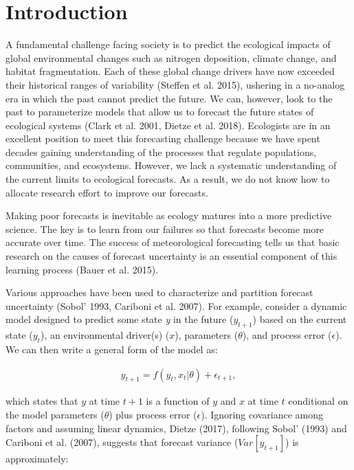\documentclass[12pt,]{article}
\begin{document}
\section{Introduction}\label{introduction}

A fundamental challenge facing society is to predict the ecological
impacts of global environmental changes such as nitrogen deposition,
climate change, and habitat fragmentation. Each of these global change
drivers have now exceeded their historical ranges of variability
(Steffen et al. 2015), ushering in a no-analog era in which the past
cannot predict the future. We can, however, look to the past to
parameterize models that allow us to forecast the future states of
ecological systems (Clark et al. 2001, Dietze et al. 2018). Ecologists
are in an excellent position to meet this forecasting challenge because
we have spent decades gaining understanding of the processes that
regulate populations, communities, and ecosystems. However, we lack a
systematic understanding of the current limits to ecological forecasts.
As a result, we do not know how to allocate research effort to improve
our forecasts.

Making poor forecasts is inevitable as ecology matures into a more
predictive science. The key is to learn from our failures so that
forecasts become more accurate over time. The success of meteorological
forecasting tells us that basic research on the causes of forecast
uncertainty is an essential component of this learning process (Bauer et
al. 2015).

Various approaches have been used to characterize and partition forecast
uncertainty (Sobol' 1993, Cariboni et al. 2007). For example, consider a
dynamic model designed to predict some state \emph{y} in the future
(\(y_{t+1}\)) based on the current state (\(y_{t}\)), an environmental
driver(s) (\(x\)), parameters (\(\theta\)), and process error
(\(\epsilon\)). We can then write a general form of the model as:

\begin{align}
y_{t+1} = f(y_t, x_t|\theta) + \epsilon_{t+1},
\end{align}

which states that \(y\) at time \(t+1\) is a function of \(y\) and \(x\)
at time \(t\) conditional on the model parameters (\(\theta\)) plus
process error (\(\epsilon\)). Ignoring covariance among factors and
assuming linear dynamics, Dietze (2017), following Sobol' (1993) and
Cariboni et al. (2007), suggests that forecast variance
(\(Var[y_{t+1}]\)) is approximately:
\end{document}
